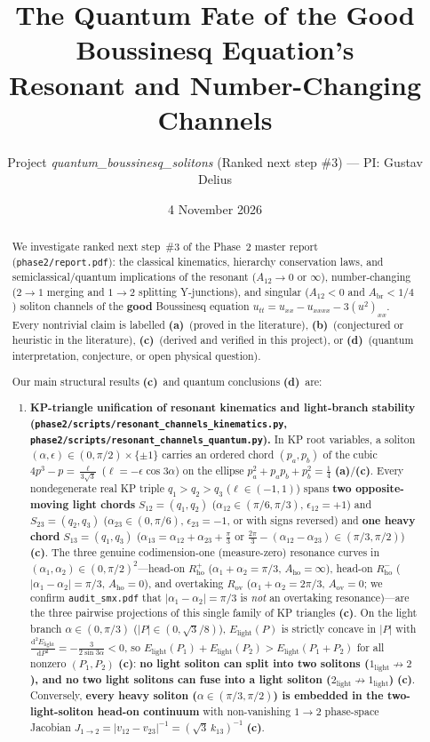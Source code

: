 \documentclass[11pt,a4paper]{article}
\title{\textbf{The Quantum Fate of the Good Boussinesq Equation's\\
Resonant and Number-Changing Channels}}
\author{Project \emph{quantum\_boussinesq\_solitons} (Ranked next step \#3) --- PI: Gustav Delius}
\date{4 November 2026}
\newcommand{\La}{\textsf{\textbf{(a)}}\xspace}
\newcommand{\Lb}{\textsf{\textbf{(b)}}\xspace}
\newcommand{\Lc}{\textsf{\textbf{(c)}}\xspace}
\newcommand{\Ld}{\textsf{\textbf{(d)}}\xspace}
\newcommand{\dd}{\mathrm{d}}
\newcommand{\skin}{\texttt{phase2/\allowbreak scripts/\allowbreak resonant\_\allowbreak channels\_\allowbreak kinematics.py}}
\newcommand{\squant}{\texttt{phase2/\allowbreak scripts/\allowbreak resonant\_\allowbreak channels\_\allowbreak quantum.py}}
\theoremstyle{remark}
\begin{document}
\maketitle

\begin{abstract}
We investigate ranked next step~\#3 of the Phase~2 master report
(\texttt{phase2/\allowbreak report.pdf}): the classical kinematics, hierarchy
conservation laws, and semiclassical/quantum implications of the resonant
($A_{12}\to 0$ or $\infty$), number-changing ($2\to 1$ merging and $1\to 2$
splitting Y-junctions), and singular ($A_{12}<0$ and $A_{\mathrm{br}}<1/4$)
soliton channels of the \textbf{good} Boussinesq equation
$u_{tt}=u_{xx}-u_{xxxx}-3(u^2)_{xx}$. Every nontrivial claim is labelled \La\
(proved in the literature), \Lb\ (conjectured or heuristic in the literature),
\Lc\ (derived and verified in this project), or \Ld\ (quantum interpretation,
conjecture, or open physical question).

Our main structural results \Lc\ and quantum conclusions \Ld\ are:
\begin{enumerate}
\item \textbf{KP-triangle unification of resonant kinematics and light-branch stability (\skin, \squant).}
In KP root variables, a soliton $(\alpha,\epsilon)\in(0,\pi/2)\times\{\pm 1\}$
carries an ordered chord $(p_a,p_b)$ of the cubic
$4p^3-p=\frac{\ell}{3\sqrt{3}}$ ($\ell=-\epsilon\cos 3\alpha$) on the ellipse
$p_a^2+p_a p_b+p_b^2=\frac{1}{4}$ \La/\Lc. Every nondegenerate real KP triple
$q_1>q_2>q_3$ ($\ell\in(-1,1)$) spans \textbf{two opposite-moving light chords}
$S_{12}=(q_1,q_2)$ ($\alpha_{12}\in(\pi/6,\pi/3),\,\epsilon_{12}=+1$) and
$S_{23}=(q_2,q_3)$ ($\alpha_{23}\in(0,\pi/6),\,\epsilon_{23}=-1$, or with
signs reversed) and \textbf{one heavy chord} $S_{13}=(q_1,q_3)$
($\alpha_{13}=\alpha_{12}+\alpha_{23}+\frac{\pi}{3}\text{ or }\frac{2\pi}{3}-(\alpha_{12}-\alpha_{23})\in(\pi/3,\pi/2)$) \Lc.
The three genuine codimension-one (measure-zero) resonance curves in
$(\alpha_1,\alpha_2)\in(0,\pi/2)^2$---head-on $R_{\mathrm{ho}}^+$
($\alpha_1+\alpha_2=\pi/3,\,A_{\mathrm{ho}}=\infty$), head-on $R_{\mathrm{ho}}^-$
($|\alpha_1-\alpha_2|=\pi/3,\,A_{\mathrm{ho}}=0$), and overtaking
$R_{\mathrm{ov}}$ ($\alpha_1+\alpha_2=2\pi/3,\,A_{\mathrm{ov}}=0$; we confirm
\texttt{audit\_smx.pdf} that $|\alpha_1-\alpha_2|=\pi/3$ is \emph{not} an
overtaking resonance)---are the three pairwise projections of this single
family of KP triangles \Lc. On the light branch $\alpha\in(0,\pi/3)$
($|P|\in(0,\sqrt{3}/8)$), $E_{\mathrm{light}}(P)$ is strictly concave in $|P|$
with $\frac{\dd^2 E_{\mathrm{light}}}{\dd P^2}=-\frac{3}{2\sin 3\alpha}<0$, so
$E_{\mathrm{light}}(P_1)+E_{\mathrm{light}}(P_2)>E_{\mathrm{light}}(P_1+P_2)$
for all nonzero $(P_1,P_2)$ \Lc: \textbf{no light soliton can split into two
solitons ($1_{\mathrm{light}}\not\to 2$), and no two light solitons can fuse
into a light soliton ($2_{\mathrm{light}}\not\to 1_{\mathrm{light}}$)} \Lc.
Conversely, \textbf{every heavy soliton ($\alpha\in(\pi/3,\pi/2)$) is embedded
in the two-light-soliton head-on continuum} with non-vanishing $1\to 2$
phase-space Jacobian $J_{1\to 2}=|v_{12}-v_{23}|^{-1}=(\sqrt{3}\,k_{13})^{-1}$ \Lc.


\end{enumerate}
\end{abstract}
\end{document}
